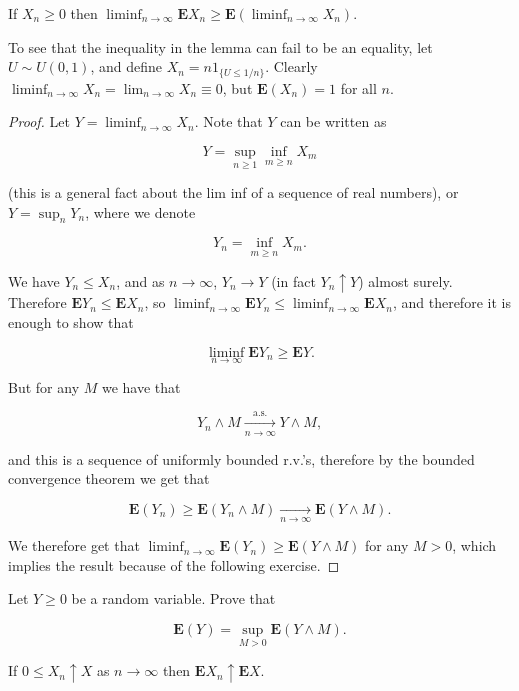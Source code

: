 \begin{thm}
If $X_n \ge 0$ then
$\liminf_{n\to\infty} \mathbf{E} X_n \ge
\mathbf{E}(\liminf_{n\to\infty} X_n).$
\end{thm}

\noindent To see that the inequality in the lemma can fail to
be an equality, let $U \sim U(0,1)$, and define
$X_n = n 1_{\{U\le 1/n\}}$. Clearly
$\liminf_{n\to\infty}X_n=\lim_{n\to\infty} X_n \equiv
0$,
but $\mathbf{E}(X_n) = 1$ for all $n$.

\begin{proof}
Let $Y = \liminf_{n\to\infty} X_n$. Note that $Y$ can
be written as

\[
Y = \sup_{n\ge 1} \inf_{m\ge n} X_m
\]

\noindent (this is a general fact about the lim inf of a
sequence of real numbers), or $Y = \sup_n Y_n$, where
we denote

\[
Y_n = \inf_{m\ge n} X_m.
\]

\noindent We have $Y_n \le X_n$, and as $n\to\infty$,
$Y_n \to Y$ (in fact $Y_n \uparrow Y$) almost surely.
Therefore $\mathbf{E} Y_n \le \mathbf{E} X_n$, so
$\liminf_{n\to\infty} \mathbf{E} Y_n \le
\liminf_{n\to\infty} \mathbf{E} X_n$,
and therefore it is enough to show that

\[
\liminf_{n\to\infty} \mathbf{E} Y_n \ge \mathbf{E} Y.
\]

\noindent But for any $M$ we have that

\[
Y_n \wedge M \xrightarrow[n\to\infty]{\textrm{a.s.}} Y \wedge M,
\]

\noindent and this is a sequence of uniformly bounded r.v.'s,
therefore by the bounded convergence theorem we get
that

\[
\mathbf{E}(Y_n) \ge \mathbf{E}(Y_n \wedge M) \xrightarrow[n\to\infty]{} \mathbf{E}(Y\wedge M).
\]

\noindent We therefore get that
$\liminf_{n\to\infty} \mathbf{E}(Y_n)\ge
\mathbf{E}(Y\wedge M)$
for any $M>0$, which implies the result because of
the following exercise.
\end{proof}

\begin{xexercise}
Let $Y\ge 0$ be a random variable. Prove that

\[
\mathbf{E}(Y) = \sup_{M>0} \mathbf{E}(Y\wedge M).
\]

\end{xexercise}

\begin{thm}
If $0\le X_n \uparrow X$ as $n\to\infty$ then
$\mathbf{E} X_n \uparrow \mathbf{E} X$.
\end{thm}

